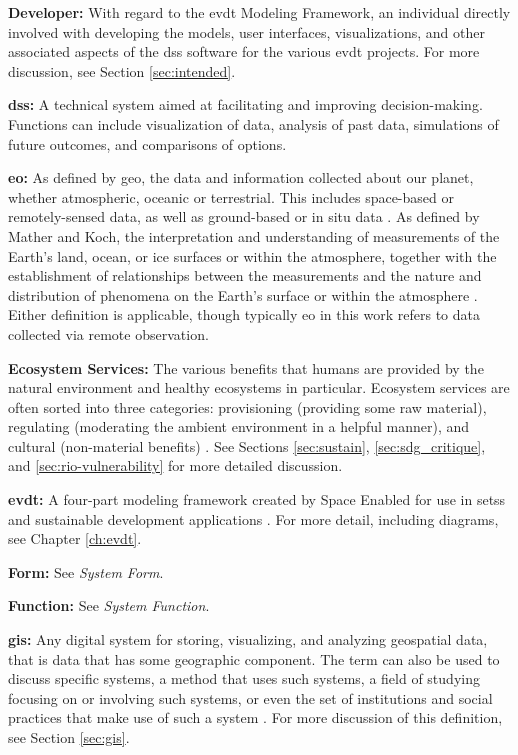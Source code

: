 \textbf{Developer:} With regard to the \ac{evdt} Modeling Framework, an individual directly involved with developing the models, user interfaces, visualizations, and other associated aspects of the \ac{dss} software for the various \ac{evdt} projects. For more discussion, see Section \ref{sec:intended}.

\textbf{\acf{dss}:} A technical system aimed at facilitating and improving decision-making. Functions can include visualization of data, analysis of past data, simulations of future outcomes, and comparisons of options.

\textbf{\acf{eo}:} As defined by \ac{geo}, the data and information collected about our planet, whether atmospheric, oceanic or terrestrial. This includes space-based or remotely-sensed data, as well as ground-based or in situ data \cite{grouponearthobservationsGEOGlance2019}. As defined by Mather and Koch, the interpretation and understanding of measurements of the Earth's land, ocean, or ice surfaces or within the atmosphere, together with the establishment of relationships between the measurements and the nature and distribution of phenomena on the Earth's surface or within the atmosphere \cite{matherComputerProcessingRemotelySensed2011}. Either definition is applicable, though typically \ac{eo} in this work refers to data collected via remote observation.

\textbf{Ecosystem Services:} The various benefits that humans are provided by the natural environment and healthy ecosystems in particular. Ecosystem services are often sorted into three categories: provisioning (providing some raw material), regulating (moderating the ambient environment in a helpful manner), and cultural (non-material benefits) \cite{haines-youngCommonInternationalClassification2018}. See Sections \ref{sec:sustain}, \ref{sec:sdg_critique}, and \ref{sec:rio-vulnerability} for more detailed discussion.

\textbf{\acf{evdt}:} A four-part modeling framework created by Space Enabled for use in \acp{sets} and sustainable development applications \cite{reidCombiningSocialEnvironmental2019}. For more detail, including diagrams, see Chapter \ref{ch:evdt}.

\textbf{Form:} See \textit{System Form}.

\textbf{Function:} See \textit{System Function}.

\textbf{\acf{gis}:} Any digital system for storing, visualizing, and analyzing geospatial data, that is data that has some geographic component. The term can also be used to discuss specific systems, a method that uses such systems, a field of studying focusing on or involving such systems, or even the set of institutions and social practices that make use of such a system \cite{sheppardGISSocietyResearch1995}. For more discussion of this definition, see Section \ref{sec:gis}.

